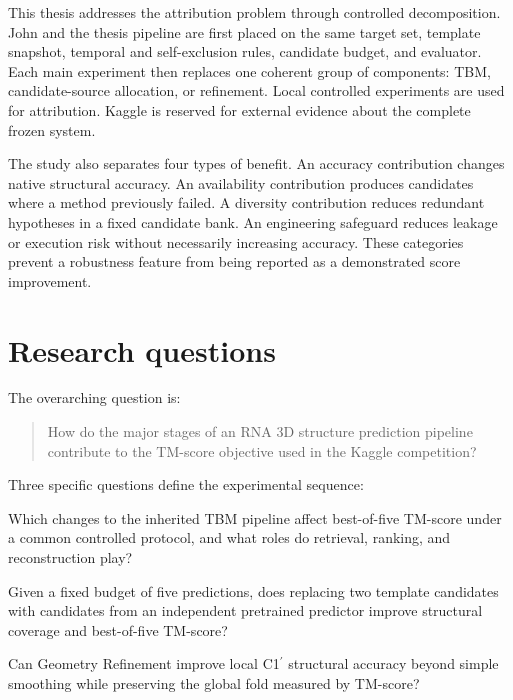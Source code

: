 \documentclass[12pt,a4paper,oneside]{report}
\newcommand{\cprime}{C1$^{\prime}$}
\begin{document}
This thesis addresses the attribution problem through controlled decomposition. John
and the thesis pipeline are first placed on the same target set, template snapshot,
temporal and self-exclusion rules, candidate budget, and evaluator. Each main
experiment then replaces one coherent group of components: TBM, candidate-source
allocation, or refinement. Local controlled experiments are used for attribution.
Kaggle is reserved for external evidence about the complete frozen system.

The study also separates four types of benefit. An accuracy contribution changes
native structural accuracy. An availability contribution produces candidates where a
method previously failed. A diversity contribution reduces redundant hypotheses in a
fixed candidate bank. An engineering safeguard reduces leakage or execution risk
without necessarily increasing accuracy. These categories prevent a robustness feature
from being reported as a demonstrated score improvement.

\section{Research questions}

The overarching question is:

\begin{quote}
How do the major stages of an RNA 3D structure prediction pipeline contribute to the
TM-score objective used in the Kaggle competition?
\end{quote}

Three specific questions define the experimental sequence:

\begin{description}[leftmargin=1.5cm,style=nextline]
  \item[RQ1.] Which changes to the inherited TBM pipeline affect best-of-five TM-score
  under a common controlled protocol, and what roles do retrieval, ranking, and
  reconstruction play?
  \item[RQ2.] Given a fixed budget of five predictions, does replacing two template
  candidates with candidates from an independent pretrained predictor improve
  structural coverage and best-of-five TM-score?
  \item[RQ3.] Can Geometry Refinement improve local \cprime{} structural accuracy
  beyond simple smoothing while preserving the global fold measured by TM-score?
\end{description}
\end{document}
